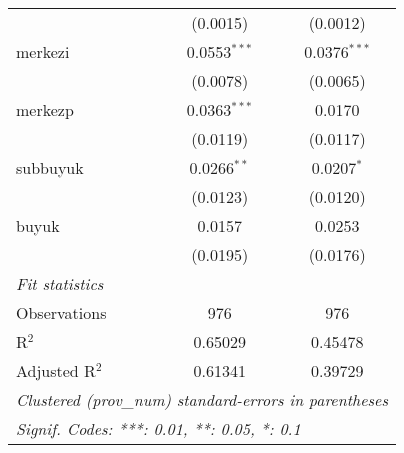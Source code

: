 \begin{table}[htbp]
\begin{tabular}{lcc}
                            & (0.0015)                & (0.0012)\\   
      merkezi               & 0.0553$^{***}$          & 0.0376$^{***}$\\   
                            & (0.0078)                & (0.0065)\\   
      merkezp               & 0.0363$^{***}$          & 0.0170\\   
                            & (0.0119)                & (0.0117)\\   
      subbuyuk              & 0.0266$^{**}$           & 0.0207$^{*}$\\   
                            & (0.0123)                & (0.0120)\\   
      buyuk                 & 0.0157                  & 0.0253\\   
                            & (0.0195)                & (0.0176)\\   
      \midrule
      \emph{Fit statistics}\\
      Observations          & 976                     & 976\\  
      R$^2$                 & 0.65029                 & 0.45478\\  
      Adjusted R$^2$        & 0.61341                 & 0.39729\\  
      \midrule \midrule
      \multicolumn{3}{l}{\emph{Clustered (prov\_num) standard-errors in parentheses}}\\
      \multicolumn{3}{l}{\emph{Signif. Codes: ***: 0.01, **: 0.05, *: 0.1}}\\
   \end{tabular}
\end{table}


